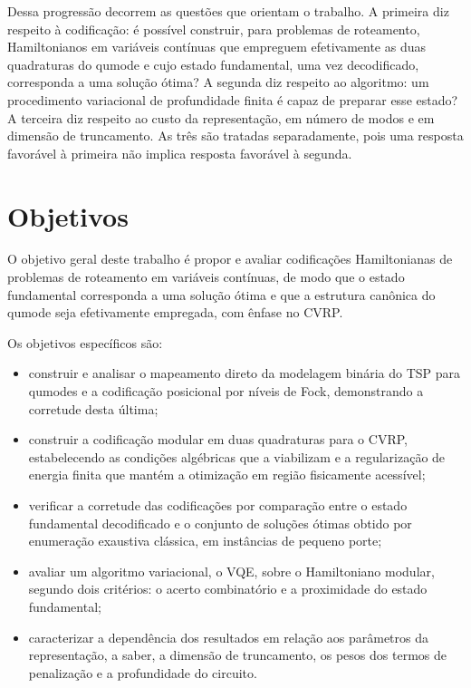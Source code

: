Dessa progressão decorrem as questões que orientam o trabalho. A primeira diz respeito à codificação: é possível construir, para problemas de roteamento, Hamiltonianos em variáveis contínuas que empreguem efetivamente as duas quadraturas do qumode e cujo estado fundamental, uma vez decodificado, corresponda a uma solução ótima? A segunda diz respeito ao algoritmo: um procedimento variacional de profundidade finita é capaz de preparar esse estado? A terceira diz respeito ao custo da representação, em número de modos e em dimensão de truncamento. As três são tratadas separadamente, pois uma resposta favorável à primeira não implica resposta favorável à segunda.

\section*{Objetivos}

O objetivo geral deste trabalho é propor e avaliar codificações Hamiltonianas de problemas de roteamento em variáveis contínuas, de modo que o estado fundamental corresponda a uma solução ótima e que a estrutura canônica do qumode seja efetivamente empregada, com ênfase no CVRP.

Os objetivos específicos são:
\begin{itemize}
    \item construir e analisar o mapeamento direto da modelagem binária do TSP para qumodes e a codificação posicional por níveis de Fock, demonstrando a corretude desta última;

    \item construir a codificação modular em duas quadraturas para o CVRP, estabelecendo as condições algébricas que a viabilizam e a regularização de energia finita que mantém a otimização em região fisicamente acessível;

    \item verificar a corretude das codificações por comparação entre o estado fundamental decodificado e o conjunto de soluções ótimas obtido por enumeração exaustiva clássica, em instâncias de pequeno porte;

    \item avaliar um algoritmo variacional, o VQE, sobre o Hamiltoniano modular, segundo dois critérios: o acerto combinatório e a proximidade do estado fundamental;

    \item caracterizar a dependência dos resultados em relação aos parâmetros da representação, a saber, a dimensão de truncamento, os pesos dos termos de penalização e a profundidade do circuito.
\end{itemize}

